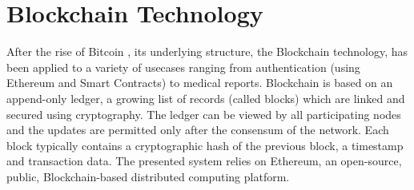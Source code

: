 \documentclass[hidelinks,conference,compsoc]{IEEEtran}
\begin{document}
\section{Blockchain Technology}
After the rise of Bitcoin \cite{nakamoto2008bitcoin}, its underlying structure, the Blockchain technology, has been applied to a variety of usecases ranging from authentication \cite{sundararajanonline} (using Ethereum and Smart Contracts) to medical reports\cite{azaria2016medrec}. Blockchain is based on an append-only ledger, a growing list of records (called blocks) which are linked and secured using cryptography. The ledger can be viewed by all participating nodes and the updates are permitted only after the consensum of the network. Each block typically contains a cryptographic hash of the previous block, a timestamp and transaction data. %
%	
The presented system relies on Ethereum, an open-source, public, Blockchain-based distributed computing platform. %
\end{document}
